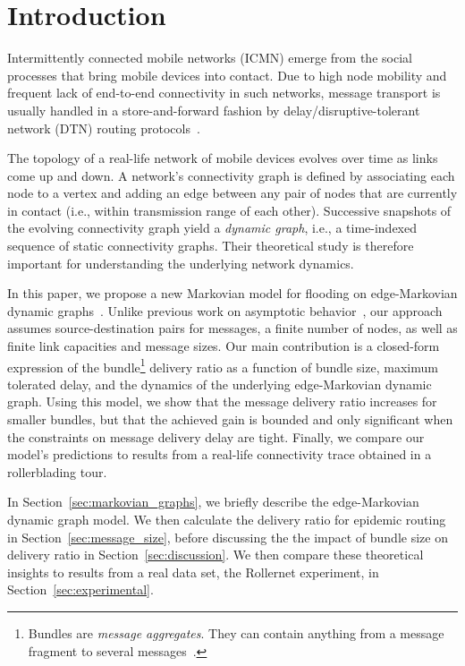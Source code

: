 \documentclass[final,journal,letterpaper]{IEEEtran}
\begin{document}
\section{Introduction}
\label{sec:introduction}

Intermittently connected mobile networks (ICMN) emerge from the social processes that bring mobile devices into contact.  Due to high node mobility and frequent lack of end-to-end connectivity in such networks, message transport is usually handled in a store-and-forward fashion by delay/disruptive-tolerant network (DTN) routing protocols~\cite{dtn_fall_sigcomm}.

The topology of a real-life network of mobile devices evolves over time as links come up and down. A network's connectivity graph is defined by associating each node to a vertex and adding an edge between any pair of nodes that are currently in contact (i.e., within transmission range of each other). Successive snapshots of the evolving connectivity graph yield a \emph{dynamic graph}, i.e., a time-indexed sequence of static connectivity graphs. Their theoretical study is therefore important for understanding the underlying network dynamics.

In this paper, we propose a new Markovian model for flooding on edge-Markovian dynamic graphs~\cite{Clementi08}. Unlike previous work on asymptotic behavior~\cite{Clementi08}, our approach assumes source-destination pairs for messages, a finite number of nodes, as well as finite link capacities and message sizes. Our main contribution is a closed-form expression of the bundle\footnote{Bundles are \emph{message aggregates}. They can contain anything from a message fragment to several messages~\cite{dtn_fall_sigcomm}.} delivery ratio as a function of bundle size, maximum tolerated delay, and the dynamics of the underlying edge-Markovian dynamic graph. Using this model, we show that the message delivery ratio increases for smaller bundles, but that the achieved gain is bounded and only significant when the constraints on message delivery delay are tight. Finally, we compare our model's predictions to results from a real-life connectivity trace obtained in a rollerblading tour.

In Section~\ref{sec:markovian_graphs}, we briefly describe the edge-Markovian dynamic graph model. We then calculate the delivery ratio for epidemic routing in Section~\ref{sec:message_size}, before discussing the the impact of bundle size on delivery ratio in Section~\ref{sec:discussion}. We then compare these theoretical insights to results from a real data set, the Rollernet experiment, in Section~\ref{sec:experimental}.
\end{document}
